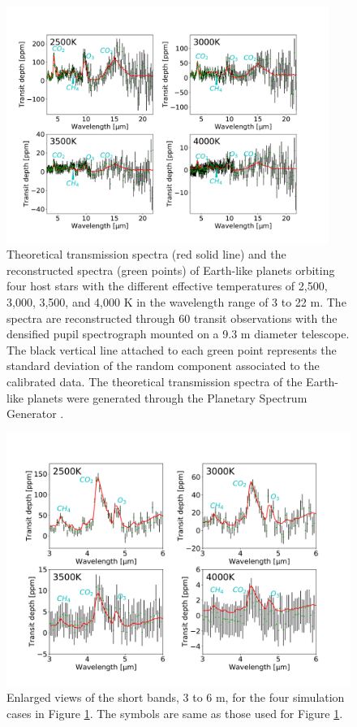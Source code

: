 \documentclass{aastex62}
\begin{document}
\begin{figure}[H]
\begin{center}
\includegraphics[width=10.5cm]{spectrum_primary.pdf}
\caption{Theoretical transmission spectra (red solid line) and the reconstructed spectra (green points) of Earth-like planets orbiting four host stars with the different effective temperatures of 2,500, 3,000, 3,500, and 4,000 K in the wavelength range of 3 to 22 \textmu m. The spectra are reconstructed through 60 transit observations with the densified pupil spectrograph mounted on a 9.3 m diameter telescope. The black vertical line attached to each green point represents the standard deviation of the random component associated to the calibrated data. The theoretical transmission spectra of the Earth-like planets were generated through the Planetary Spectrum Generator \citep{2015Sci...348..218V}. \label{fig:spectrum_primary}}
\end{center}
\end{figure}

\begin{figure}[H]
\begin{center}
\includegraphics[width=12cm]{spectrum_primary_short.pdf}
\caption{Enlarged views of the short bands, 3 to 6 \textmu m, for the four simulation cases in Figure \ref{fig:spectrum_primary}. The symbols are same as those used for Figure \ref{fig:spectrum_primary}. \label{fig:spectrum_primary_short}}
\end{center}
\end{figure}
\end{document}
